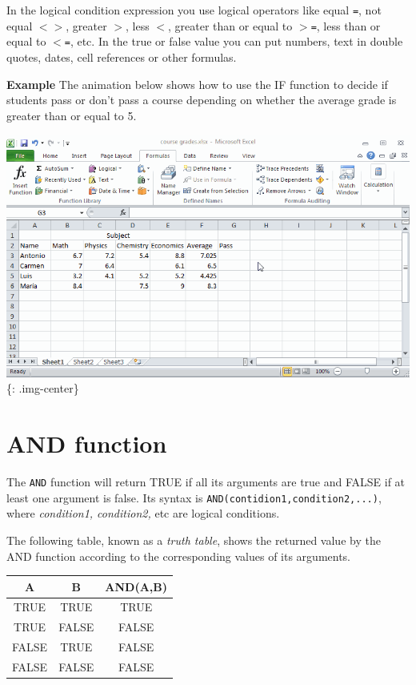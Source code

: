 In the logical condition expression you use logical operators like equal \texttt{=}, not equal \texttt{$<$$>$}, greater \texttt{$>$}, less \texttt{$<$}, greater than or equal to \texttt{$>$=}, less than or equal to \texttt{$<$=}, etc. In the true or false value you can put numbers, text in double quotes, dates, cell references or other formulas. 

\textbf{Example} The animation below shows how to use the IF function to decide if students pass or don't pass a course depending on whether the average grade is greater than or equal to 5.

\includegraphics[keepaspectratio,width=\textwidth,height=0.75\textheight]{img/example_function_if.gif}
\{: .img-center\}

\section{AND function}
\label{andfunction}

The \texttt{AND} function will return TRUE if all its arguments are true and FALSE if at least one argument is false. Its syntax is \texttt{AND(contidion1,condition2,...)}, where \emph{condition1, condition2,} etc are logical conditions. 

The following table, known as a \emph{truth table}, shows the returned value by the AND function according to the corresponding values of its arguments.

\begin{table}[htbp]
\begin{minipage}{\linewidth}
\setlength{\tymax}{0.5\linewidth}
\centering
\small
\begin{tabulary}{\textwidth}{@{}CCC@{}} \toprule
A&B&AND(A,B)\\
\midrule
TRUE&TRUE&TRUE\\
TRUE&FALSE&FALSE\\
FALSE&TRUE&FALSE\\
FALSE&FALSE&FALSE\\

\bottomrule

\end{tabulary}
\end{minipage}
\end{table}




